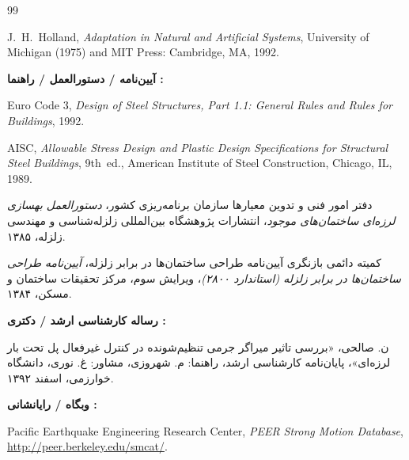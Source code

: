 \begin{thebibliography}{99}
\begin{LTRbibitems}
\resetlatinfont
{}
J.~H.~Holland, \emph{Adaptation in Natural and Artificial Systems}, University of Michigan (1975) and MIT Press: Cambridge, MA, 1992.
\end{LTRbibitems}


\item[] \noindent\textbf{آیین‌نامه / دستورالعمل / راهنما :}

\begin{LTRbibitems}
\resetlatinfont
{}
Euro Code 3, \emph{Design of Steel Structures, Part 1.1: General Rules and Rules for Buildings}, 1992.

AISC, \emph{Allowable Stress Design and Plastic Design Specifications for Structural Steel Buildings}, 9th~ed., American Institute of Steel Construction, Chicago, IL, 1989.
\end{LTRbibitems}

دفتر امور فنی و تدوین معیارها سازمان برنامه‌ریزی کشور، \emph{دستورالعمل بهسازی لرزه‌ای ساختمان‌های موجود}، انتشارات پژوهشگاه بین‌المللی زلزله‌شناسی و مهندسی زلزله، ۱۳۸۵.

کمیته دائمی بازنگری آیین‌نامه طراحی ساختمان‌ها در برابر زلزله، \emph{آیین‌نامه طراحی ساختمان‌ها در برابر زلزله (استاندارد ۲۸۰۰)}، ویرایش سوم، مرکز تحقیقات ساختمان و مسکن، ۱۳۸۴.


\item[] \noindent\textbf{رساله کارشناسی ارشد / دکتری :}

ن. صالحی، «بررسی تاثیر میراگر جرمی تنظیم‌شونده در کنترل غیرفعال پل تحت بار لرزه‌ای»، پایان‌نامه کارشناسی ارشد، راهنما: م. شهروزی، مشاور: غ. نوری، دانشگاه خوارزمی، اسفند ۱۳۹۲.


\item[] \noindent\textbf{وبگاه / رایانشانی :}

\begin{LTRbibitems}
\resetlatinfont
{}
Pacific Earthquake Engineering Research Center, \emph{PEER Strong Motion Database}, \url{http://peer.berkeley.edu/smcat/}.
\end{LTRbibitems}

\end{thebibliography}
